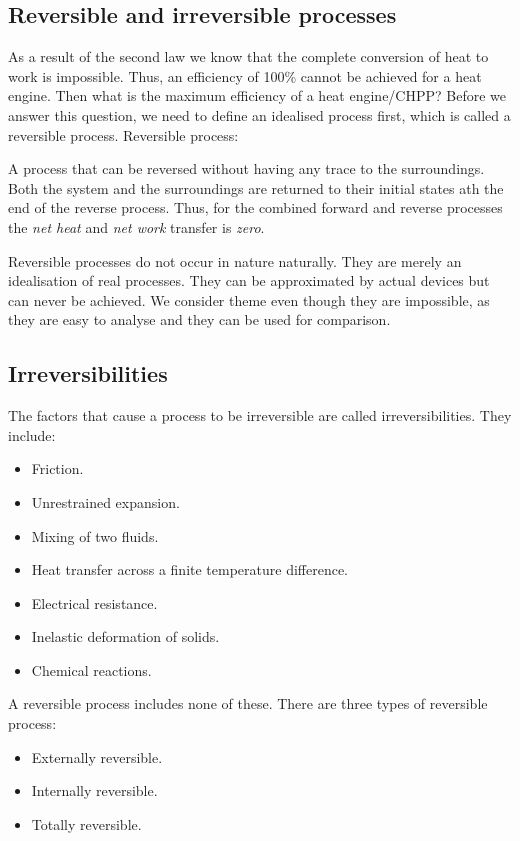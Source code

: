 \documentclass[class=report, crop=false, 12pt,a4paper]{standalone}
\begin{document}
\subsection{Reversible and irreversible processes}
As a result of the second law we know that the complete conversion of heat to work is impossible. Thus, an efficiency of 100\% cannot be achieved for a heat engine. Then what is the maximum efficiency of a heat engine/CHPP? Before we answer this question, we need to define an idealised process first, which is called a reversible process.
Reversible process:
\begin{center}
  A process that can be reversed without having any trace to the surroundings. Both the system and the surroundings are returned to their initial states ath the end of the reverse process. Thus, for the combined forward and reverse processes the \emph{net heat} and \emph{net work} transfer is \emph{zero}.
\end{center}
Reversible processes do not occur in nature naturally. They are merely an idealisation of real processes. They can be approximated by actual devices but can never be achieved. We consider theme even though they are impossible, as they are easy to analyse and they can be used for comparison.
\subsection{Irreversibilities}
The factors that cause a process to be irreversible are called irreversibilities. 
They include:
\begin{itemize}[noitemsep]
  \item Friction.
  \item Unrestrained expansion.
  \item Mixing of two fluids.
  \item Heat transfer across a finite temperature difference.
  \item Electrical resistance.
  \item Inelastic deformation of solids.
  \item Chemical reactions.
\end{itemize}
A reversible process includes none of these. There are three types of reversible process:
\begin{itemize}[noitemsep]
  \item Externally reversible.
  \item Internally reversible.
  \item Totally reversible.
\end{itemize}
\end{document}

